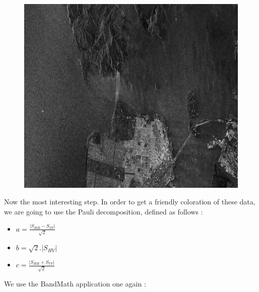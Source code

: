 \begin{center}
   \begin{figure}[h!]
    \includegraphics[width=\textwidth]{../Art/RSAT2_VV_Frisco.png}
    \label{fig:vvfrisco}
   \end{figure}
\end{center}


Now the most interesting step. In order to get a friendly coloration of these data, we are going to use the Pauli decomposition,
defined as follows :

\begin{itemize}
\item  $a=\frac{|S_{HH}-S_{VV}|}{\sqrt{2}}$ 
									  
\item  $b=\sqrt{2}.|S_{HV}|$ 
									  
\item  $c=\frac{|S_{HH}+S_{VV}|}{\sqrt{2}}$ 
\end{itemize}

We use the BandMath application one again :

